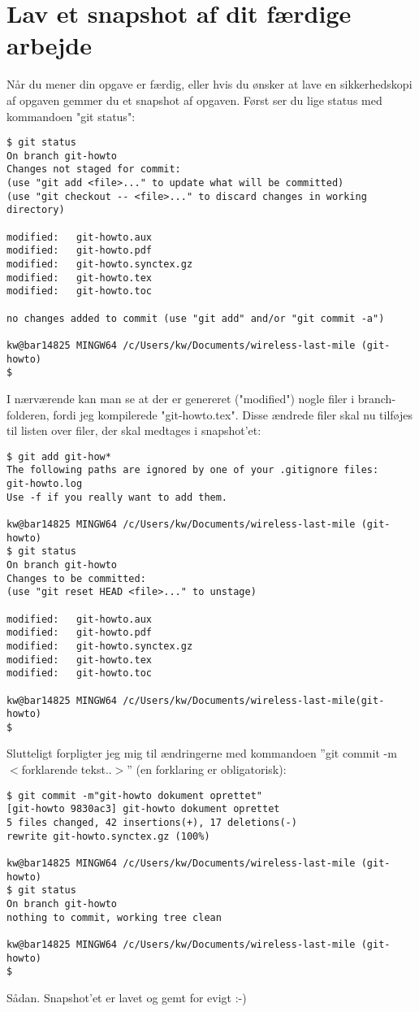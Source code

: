 \documentclass[11pt,a4paper,twoside]{report}
\begin{document}
\section{Lav et snapshot af dit færdige arbejde}
Når du mener din opgave er færdig, eller hvis du ønsker at lave en sikkerhedskopi af opgaven gemmer du et snapshot af opgaven. Først ser du lige status med kommandoen "git status":
\begin{verbatim}
$ git status
On branch git-howto
Changes not staged for commit:
(use "git add <file>..." to update what will be committed)
(use "git checkout -- <file>..." to discard changes in working directory)

modified:   git-howto.aux
modified:   git-howto.pdf
modified:   git-howto.synctex.gz
modified:   git-howto.tex
modified:   git-howto.toc

no changes added to commit (use "git add" and/or "git commit -a")

kw@bar14825 MINGW64 /c/Users/kw/Documents/wireless-last-mile (git-howto)
$
\end{verbatim}
I nærværende kan man se at der er genereret ("modified") nogle filer i branch-folderen, fordi jeg kompilerede "git-howto.tex". Disse ændrede filer skal nu tilføjes til listen over filer, der skal medtages i snapshot'et:
\begin{verbatim}
$ git add git-how*
The following paths are ignored by one of your .gitignore files:
git-howto.log
Use -f if you really want to add them.

kw@bar14825 MINGW64 /c/Users/kw/Documents/wireless-last-mile (git-howto)
$ git status
On branch git-howto
Changes to be committed:
(use "git reset HEAD <file>..." to unstage)

modified:   git-howto.aux
modified:   git-howto.pdf
modified:   git-howto.synctex.gz
modified:   git-howto.tex
modified:   git-howto.toc

kw@bar14825 MINGW64 /c/Users/kw/Documents/wireless-last-mile(git-howto)
$
\end{verbatim}
Slutteligt forpligter jeg mig til ændringerne med kommandoen ''git commit -m $<$forklarende tekst..$>$'' (en forklaring er obligatorisk):
\begin{verbatim}
$ git commit -m"git-howto dokument oprettet"
[git-howto 9830ac3] git-howto dokument oprettet
5 files changed, 42 insertions(+), 17 deletions(-)
rewrite git-howto.synctex.gz (100%)

kw@bar14825 MINGW64 /c/Users/kw/Documents/wireless-last-mile (git-howto)
$ git status
On branch git-howto
nothing to commit, working tree clean

kw@bar14825 MINGW64 /c/Users/kw/Documents/wireless-last-mile (git-howto)
$
\end{verbatim}
Sådan. Snapshot'et er lavet og gemt for evigt :-)
\end{document}
